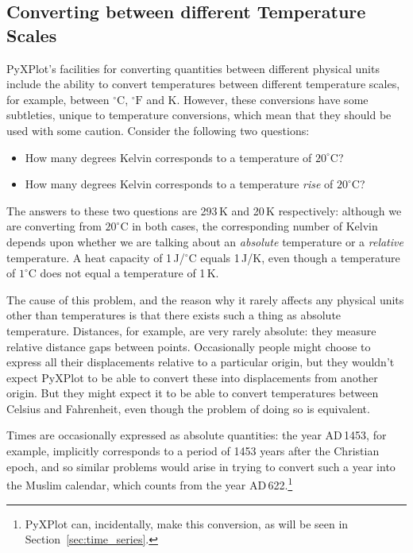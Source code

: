 \subsection{Converting between different Temperature Scales}

PyXPlot's facilities for converting quantities between different physical units
include the ability to convert temperatures between different temperature
scales, for example, between $^\circ\mathrm{C}$, $^\circ\mathrm{F}$ and K.
However, these conversions have some subtleties, unique to temperature
conversions, which mean that they should be used with some caution. Consider
the following two questions:
\begin{itemize}
\item How many degrees Kelvin corresponds to a temperature of $20^\circ$C?
\item How many degrees Kelvin corresponds to a temperature {\it rise} of $20^\circ$C?
\end{itemize}
The answers to these two questions are 293\,K and 20\,K respectively: although
we are converting from $20^\circ$C in both cases, the corresponding number of
Kelvin depends upon whether we are talking about an {\it absolute} temperature
or a {\it relative} temperature. A heat capacity of 1\,J/$^\circ$C equals
1\,J/K, even though a temperature of $1^\circ$C does not equal a temperature of
1\,K.

The cause of this problem, and the reason why it rarely affects any physical
units other than temperatures is that there exists such a thing as absolute
temperature. Distances, for example, are very rarely absolute: they measure
relative distance gaps between points. Occasionally people might choose to
express all their displacements relative to a particular origin, but they
wouldn't expect PyXPlot to be able to convert these into displacements from
another origin. But they might expect it to be able to convert temperatures
between Celsius and Fahrenheit, even though the problem of doing so is
equivalent.

Times are occasionally expressed as absolute quantities: the year
{\footnotesize AD}\,1453, for example, implicitly corresponds to a period of
1453 years after the Christian epoch, and so similar problems would arise in
trying to convert such a year into the Muslim calendar, which counts from the
year {\footnotesize AD}\,622.\footnote{PyXPlot can, incidentally, make this
conversion, as will be seen in Section~\ref{sec:time_series}.}

